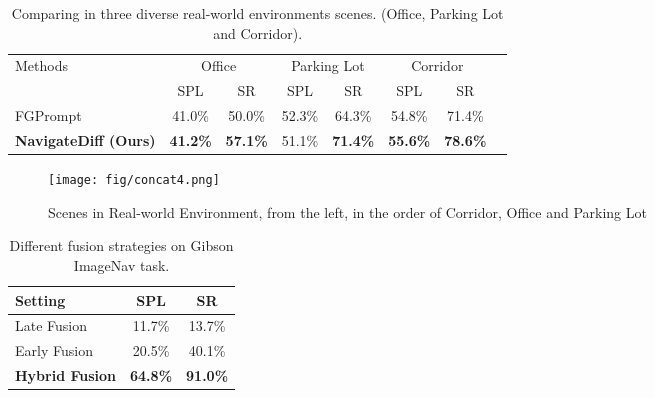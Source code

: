 \begin{table}[t]
\centering
\scriptsize
\caption{Comparing in three diverse real-world environments scenes. (Office, Parking Lot and Corridor).}
\vspace{-3mm}
\begin{tabular}{@{}lccccccc@{}}
\toprule
\multirow{2}{*}{Methods}  & \multicolumn{2}{c}{Office} & \multicolumn{2}{c}{Parking Lot} & \multicolumn{2}{c}{Corridor} \\ 
\cmidrule(l){2-7} 
                     & SPL         & SR         & SPL         & SR       & SPL         & SR   \\ 
\midrule

FGPrompt~\cite{sun2024fgprompt}            &41.0\%& 50.0\%& 52.3\%& 64.3\% & 54.8\%& 71.4\%\\ 
\textbf{NavigateDiff (Ours)}        & \textbf{41.2\%}& \textbf{57.1\%}& 51.1\%& \textbf{71.4\%} & \textbf{55.6\%}& \textbf{78.6\%}\\ 
\bottomrule
\end{tabular}
\vspace{-2mm}
\label{tab:real-world}
\end{table}


\begin{figure}[t]
  \centering 
  \texttt{[image: fig/concat4.png]}
  \vspace{-2mm}
  \caption{Scenes in Real-world Environment, from the left, in the order of Corridor, Office and Parking Lot}
  \label{fig:real-world scenes}
\end{figure}

\begin{table}[t]
\centering
\small
\caption{Different fusion strategies on Gibson ImageNav task.}
\vspace{-3mm}
\begin{tabular}{@{}lcc@{}}
\toprule
Setting                       & SPL             & SR     \\ 
\midrule
Late Fusion                  & 11.7\%          & 13.7\% \\
Early Fusion                  & 20.5\%          & 40.1\% \\
\textbf{Hybrid Fusion} & \textbf{64.8\%} & \textbf{91.0\%} \\
\bottomrule
\end{tabular}
\label{tab:fusion}
\vspace{-3mm}
\end{table}



